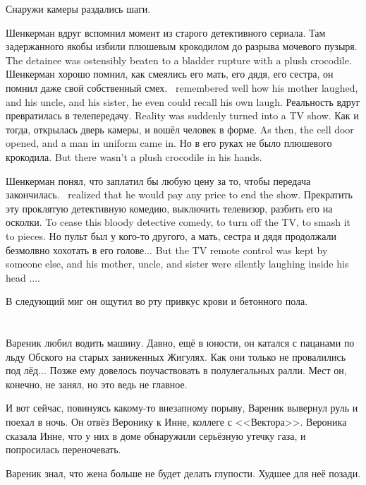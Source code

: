 Снаружи камеры раздались шаги.

Шенкерман вдруг вспомнил момент из старого детективного сериала.
{Там задержанного якобы избили плюшевым крокодилом до разрыва мочевого пузыря.}
{The detainee was ostensibly beaten to a bladder rupture with a plush crocodile.}
{Шенкерман хорошо помнил, как смеялись его мать, его дядя, его сестра, он помнил даже свой собственный смех.}
{\Shenkerman\ remembered well how his mother laughed, and his uncle, and his sister, he even could recall his own laugh.}
{Реальность вдруг превратилась в телепередачу.}
{Reality was suddenly turned into a TV show.}
{Как и тогда, открылась дверь камеры, и вошёл человек в форме.}
{As then, the cell door opened, and a man in uniform came in.}
{Но в его руках не было плюшевого крокодила.}
{But there wasn't a plush crocodile in his hands.}

{Шенкерман понял, что заплатил бы любую цену за то, чтобы передача закончилась.}
{\Shenkerman\ realized that he would pay any price to end the show.}
{Прекратить эту проклятую детективную комедию, выключить телевизор, разбить его на осколки.}
{To cease this bloody detective comedy, to turn off the TV, to smash it to pieces.}
{Но пульт был у кого-то другого, а мать, сестра и дядя продолжали безмолвно хохотать в его голове...}
{But the TV remote control was kept by someone else, and his mother, uncle, and sister were silently laughing inside his head ....}

В следующий миг он ощутил во рту привкус крови и бетонного пола.

\chapter{}

\textspace

Вареник любил водить машину.
Давно, ещё в юности, он катался с пацанами по льду Обского на старых заниженных Жигулях.
Как они только не провалились под лёд...
Позже ему довелось поучаствовать в полулегальных ралли.
Мест он, конечно, не занял, но это ведь не главное.

И вот сейчас, повинуясь какому-то внезапному порыву, Вареник вывернул руль и поехал в ночь.
Он отвёз Веронику к Инне, коллеге с <<Вектора>>.
Вероника сказала Инне, что у них в доме обнаружили серьёзную утечку газа, и попросилась переночевать.

Вареник знал, что жена больше не будет делать глупости.
Худшее для неё позади.


